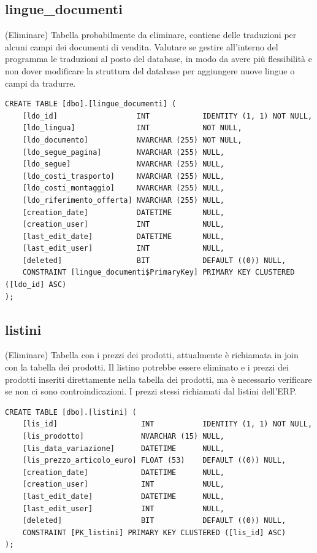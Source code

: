 \documentclass[12pt]{article}
\begin{document}
\subsection{lingue\_documenti}(Eliminare)
Tabella probabilmente da eliminare, contiene delle traduzioni per alcuni campi dei documenti di vendita.
Valutare se gestire all'interno del programma le traduzioni al posto del database,
in modo da avere più flessibilità e non dover modificare la struttura del database per aggiungere nuove lingue o campi da tradurre.
\begin{lstlisting}
CREATE TABLE [dbo].[lingue_documenti] (
    [ldo_id]                  INT            IDENTITY (1, 1) NOT NULL,
    [ldo_lingua]              INT            NOT NULL,
    [ldo_documento]           NVARCHAR (255) NOT NULL,
    [ldo_segue_pagina]        NVARCHAR (255) NULL,
    [ldo_segue]               NVARCHAR (255) NULL,
    [ldo_costi_trasporto]     NVARCHAR (255) NULL,
    [ldo_costi_montaggio]     NVARCHAR (255) NULL,
    [ldo_riferimento_offerta] NVARCHAR (255) NULL,
    [creation_date]           DATETIME       NULL,
    [creation_user]           INT            NULL,
    [last_edit_date]          DATETIME       NULL,
    [last_edit_user]          INT            NULL,
    [deleted]                 BIT            DEFAULT ((0)) NULL,
    CONSTRAINT [lingue_documenti$PrimaryKey] PRIMARY KEY CLUSTERED ([ldo_id] ASC)
);
\end{lstlisting}

\subsection{listini}(Eliminare)
Tabella con i prezzi dei prodotti, attualmente è richiamata in join con la tabella dei prodotti.
Il listino potrebbe essere eliminato e i prezzi dei prodotti inseriti direttamente nella tabella dei prodotti,
ma è necessario verificare se non ci sono controindicazioni.
I prezzi stessi richiamati dal listini dell'ERP.\@
\begin{lstlisting}
CREATE TABLE [dbo].[listini] (
    [lis_id]                   INT           IDENTITY (1, 1) NOT NULL,
    [lis_prodotto]             NVARCHAR (15) NULL,
    [lis_data_variazione]      DATETIME      NULL,
    [lis_prezzo_articolo_euro] FLOAT (53)    DEFAULT ((0)) NULL,
    [creation_date]            DATETIME      NULL,
    [creation_user]            INT           NULL,
    [last_edit_date]           DATETIME      NULL,
    [last_edit_user]           INT           NULL,
    [deleted]                  BIT           DEFAULT ((0)) NULL,
    CONSTRAINT [PK_listini] PRIMARY KEY CLUSTERED ([lis_id] ASC)
);
\end{lstlisting}
\end{document}
